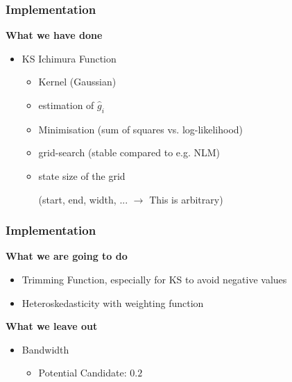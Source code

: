 \documentclass{beamer}
\begin{document}
\begin{frame}[t]
	\frametitle{Implementation}

	\textbf{What we have done}
	\begin{itemize}
		\item KS Ichimura Function 
		\begin{itemize}\item Kernel (Gaussian) 
			\item estimation of $\hat{g}_{i}$ 
			\item Minimisation (sum of squares vs. log-likelihood) 
			\item grid-search (stable compared to e.g. NLM) 
			\item state size of the grid \\
				\begin{center}(start, end, width, ... $\rightarrow$ This is arbitrary) 
				\end{center} 
		\end{itemize}
	\end{itemize}
	\note{~}
\end{frame}



\begin{frame}[t]
	\frametitle{Implementation}

	\textbf{What we are going to do}
	\begin{itemize}
		\item Trimming Function, especially for KS to avoid negative values
		\item Heteroskedasticity with weighting function
	\end{itemize}

	\smallskip

	\textbf{What we leave out}
	\begin{itemize}
		\item Bandwidth
		\begin{itemize}
			\item Potential Candidate: $0.2$
		\end{itemize}
	\end{itemize}
	\note{~}
\end{frame}
\end{document}
